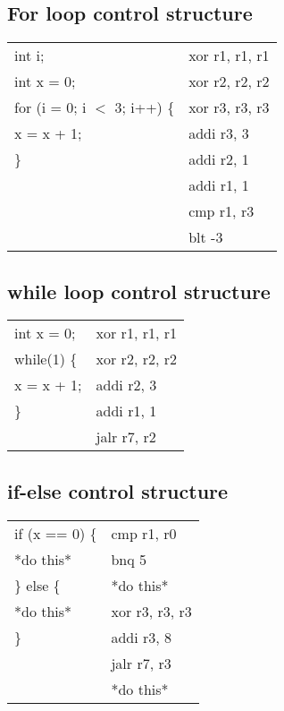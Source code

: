 \documentclass{article}
\begin{document}
\begin{par}
	\subsection{For loop control structure}
	\begin{center}
		\begin{tabular}{|l|l|}
			\hline
			int i; & xor r1, r1, r1 \\
			int x = 0; & xor r2, r2, r2 \\
			for (i = 0; i $ < $ 3; i++) \{ & xor r3, r3, r3 \\
			x = x + 1; & addi r3, 3 \\
			\} & addi r2, 1 \\
			& addi r1, 1  \\
			& cmp r1, r3 \\
			& blt -3 \\
			\hline
		\end{tabular}
	\end{center}

	\subsection{while loop control structure}
	\begin{center}
		\begin{tabular}{|l|l|}
			\hline
			int x = 0; & xor r1, r1, r1 \\
			while(1) \{ & xor r2, r2, r2 \\
			x = x + 1; & addi r2, 3 \\
			\} & addi r1, 1 \\
			& jalr r7, r2 \\
			\hline
		\end{tabular}
	\end{center}

	\subsection{if-else control structure}
	\begin{center}
		\begin{tabular}{|l|l|}
			\hline
			if (x == 0) \{ & cmp r1, r0 \\
				*do this* & bnq 5 \\
			\} else \{ & *do this* \\
				*do this* & xor r3, r3, r3 \\
			\} & addi r3, 8 \\
			& jalr r7, r3 \\
			& *do this* \\
			\hline
		\end{tabular}
	\end{center}


\end{par}
\end{document}
